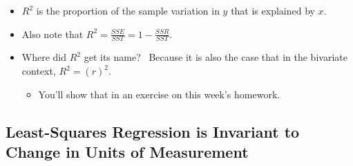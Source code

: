 \documentclass[11pt]{article}
\begin{document}
\begin{itemize}
\begin{itemize}
\begin{itemize}
\item $R^{2}$ is the proportion of the sample variation in $y$ that is
explained by $x$.

\item Also note that $R^{2}=\frac{SSE}{SST}=1-\frac{SSR}{SST}.$

\item Where did $R^{2}$ get its name? \ Because it is also the case that in
the bivariate context, $R^{2}=\left( r\right) ^{2}.$

\begin{itemize}
\item You'll show that in an exercise on this week's homework.
\end{itemize}
\end{itemize}
\end{itemize}
\end{itemize}

\subsection{Least-Squares Regression is Invariant to Change in Units of
Measurement}
\end{document}
